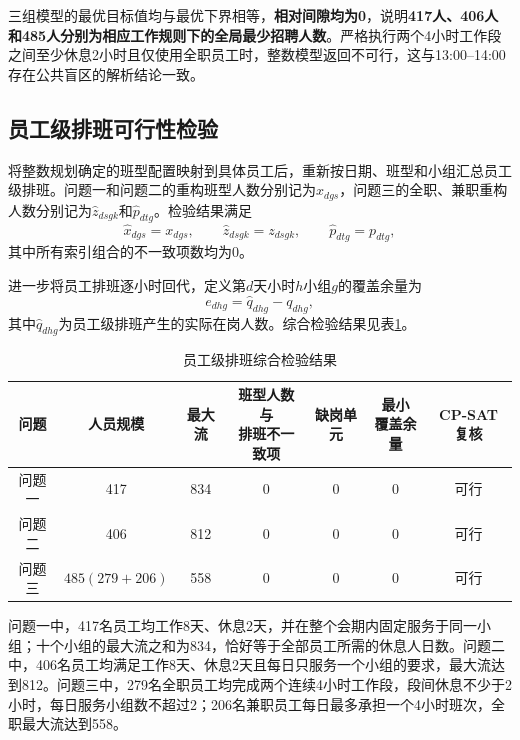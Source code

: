 \documentclass[withoutpreface,bwprint]{cumcmthesis}
\begin{document}
三组模型的最优目标值均与最优下界相等，\textbf{相对间隙均为0}，说明\textbf{417人、406人和485人分别为相应工作规则下的全局最少招聘人数}。严格执行两个4小时工作段之间至少休息2小时且仅使用全职员工时，整数模型返回不可行，这与13:00--14:00存在公共盲区的解析结论一致。

\subsection{员工级排班可行性检验}

将整数规划确定的班型配置映射到具体员工后，重新按日期、班型和小组汇总员工级排班。问题一和问题二的重构班型人数分别记为$\widehat{x}_{dgs}$，问题三的全职、兼职重构人数分别记为$\widehat{z}_{dsgk}$和$\widehat{p}_{dtg}$。检验结果满足
\begin{equation}
\widehat{x}_{dgs}=x_{dgs},\qquad
\widehat{z}_{dsgk}=z_{dsgk},\qquad
\widehat{p}_{dtg}=p_{dtg},
\label{eq:macro-micro-consistency}
\end{equation}
其中所有索引组合的不一致项数均为0。

进一步将员工排班逐小时回代，定义第$d$天小时$h$小组$g$的覆盖余量为
\begin{equation}
e_{dhg}=\widehat{q}_{dhg}-q_{dhg},
\label{eq:coverage-margin-check}
\end{equation}
其中$\widehat{q}_{dhg}$为员工级排班产生的实际在岗人数。综合检验结果见表\ref{tab:roster-check-summary}。

\begin{table}[H]
\centering
\caption{员工级排班综合检验结果}
\label{tab:roster-check-summary}
\begin{tabular}{ccccccc}
\toprule
问题 & 人员规模 & 最大流 & \shortstack{班型人数与\\排班不一致项} & 缺岗单元 & \shortstack{最小\\覆盖余量} & CP-SAT复核\\
\midrule
问题一 & 417 & 834 & 0 & 0 & 0 & 可行\\
问题二 & 406 & 812 & 0 & 0 & 0 & 可行\\
问题三 & $485(279+206)$ & 558 & 0 & 0 & 0 & 可行\\
\bottomrule
\end{tabular}
\end{table}

问题一中，417名员工均工作8天、休息2天，并在整个会期内固定服务于同一小组；十个小组的最大流之和为834，恰好等于全部员工所需的休息人日数。问题二中，406名员工均满足工作8天、休息2天且每日只服务一个小组的要求，最大流达到812。问题三中，279名全职员工均完成两个连续4小时工作段，段间休息不少于2小时，每日服务小组数不超过2；206名兼职员工每日最多承担一个4小时班次，全职最大流达到558。
\end{document}
